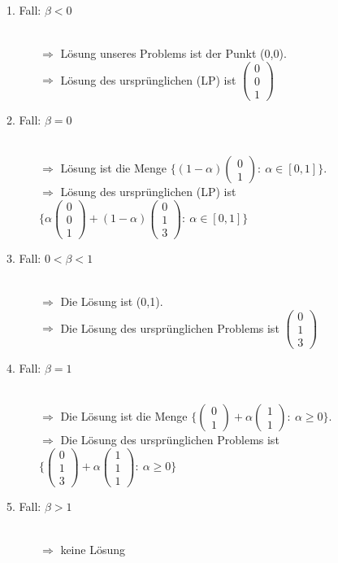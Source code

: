 \documentclass[a4paper,11pt,twoside,titlepage]{article}
\begin{document}
\begin{description}
\item[1. Fall: $\beta<0$]~\\ $\Rightarrow$ Lösung unseres Problems ist der Punkt (0,0).\\
$\Rightarrow$ Lösung des ursprünglichen (LP) ist $\left(\begin{array}{c}
0\\0\\1
\end{array}\right)$
\item[2. Fall: $\beta=0$]~\\ $\Rightarrow$ Lösung ist die Menge $\{(1-\alpha)\left(\begin{array}{c}
0\\1
\end{array}\right):\ \alpha\in[0,1]\}$.\\
$\Rightarrow$ Lösung des ursprünglichen (LP) ist $\{\alpha\left(\begin{array}{c}
0\\0\\1
\end{array}\right)+(1-\alpha)\left(\begin{array}{c}
0\\1\\3
\end{array}\right):\ \alpha\in[0,1]\}$
\item[3. Fall: $0<\beta<1$]~\\ $\Rightarrow$ Die Lösung ist (0,1).\\
$\Rightarrow$ Die Lösung des ursprünglichen Problems ist $\left(\begin{array}{c}
0\\1\\3
\end{array}\right)$
\item[4. Fall: $\beta=1$]~\\ $\Rightarrow$ Die Lösung ist die Menge $\{\left(\begin{array}{c}
0\\1
\end{array}\right)+\alpha\left(\begin{array}{c}
1\\1
\end{array}\right):\ \alpha\geq0\}$.\\
$\Rightarrow$ Die Lösung des ursprünglichen Problems ist $\{\left(\begin{array}{c}
0\\1\\3
\end{array}\right)+\alpha\left(\begin{array}{c}
1\\1\\1\end{array}\right):\ \alpha\geq0\}$
\item[5. Fall: $\beta>1$]~\\ $\Rightarrow$ keine Lösung 
\end{description}
\end{document}

